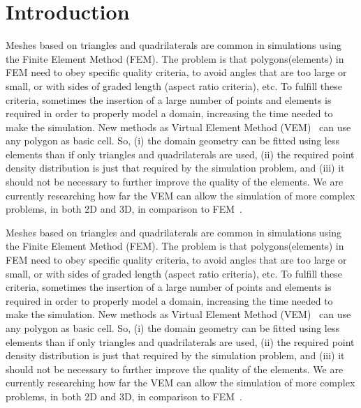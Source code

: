 \documentclass[pdflatex,sn-mathphys]{sn-jnl}%
\theoremstyle{thmstyleone}%
\theoremstyle{thmstyletwo}%
\theoremstyle{thmstylethree}%
\begin{document}
\section{Introduction}\label{sec1}

Meshes based on triangles and quadrilaterals are common in simulations using the Finite Element Method (FEM). The problem is that polygons(elements) in FEM need to obey specific quality criteria, to avoid angles that are too large or small, or with sides of graded  length (aspect ratio criteria), etc. To fulfill these criteria, sometimes the insertion of a large number of points and elements is required in order to properly model a domain, increasing the time needed to make the simulation. New methods as Virtual Element Method (VEM)~\cite{Basisprinciples,Brezzi2015} can use any polygon as basic cell. So, (i) the domain geometry can be fitted using  less elements than if only triangles and quadrilaterals are used, (ii) the required point density distribution is just that required by the simulation problem, and (iii) it should not be necessary to further improve the quality of the elements. We are currently researching how far the VEM can allow the simulation of more complex problems, in both 2D and 3D, in comparison to FEM~\cite{Wriggers2019}.



Meshes based on triangles and quadrilaterals are common in simulations using the Finite Element Method (FEM). The problem is that polygons(elements) in FEM need to obey specific quality criteria, to avoid angles that are too large or small, or with sides of graded  length (aspect ratio criteria), etc. To fulfill these criteria, sometimes the insertion of a large number of points and elements is required in order to properly model a domain, increasing the time needed to make the simulation. New methods as Virtual Element Method (VEM)~\cite{Basisprinciples,Brezzi2015} can use any polygon as basic cell. So, (i) the domain geometry can be fitted using  less elements than if only triangles and quadrilaterals are used, (ii) the required point density distribution is just that required by the simulation problem, and (iii) it should not be necessary to further improve the quality of the elements. We are currently researching how far the VEM can allow the simulation of more complex problems, in both 2D and 3D, in comparison to FEM~\cite{Wriggers2019}.



\end{document}
